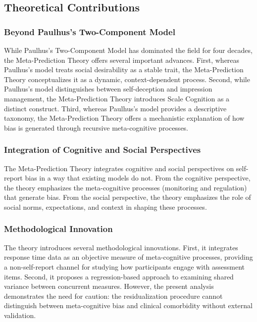 \documentclass[10pt,twocolumn]{article}
\begin{document}
\subsection{Theoretical Contributions}

\subsubsection{Beyond Paulhus's Two-Component Model}

While Paulhus's \citep{Paulhus1984} Two-Component Model has dominated the field for four decades, the Meta-Prediction Theory offers several important advances. First, whereas Paulhus's model treats social desirability as a stable trait, the Meta-Prediction Theory conceptualizes it as a dynamic, context-dependent process. Second, while Paulhus's model distinguishes between self-deception and impression management, the Meta-Prediction Theory introduces Scale Cognition as a distinct construct. Third, whereas Paulhus's model provides a descriptive taxonomy, the Meta-Prediction Theory offers a mechanistic explanation of how bias is generated through recursive meta-cognitive processes.

\subsubsection{Integration of Cognitive and Social Perspectives}

The Meta-Prediction Theory integrates cognitive and social perspectives on self-report bias in a way that existing models do not. From the cognitive perspective, the theory emphasizes the meta-cognitive processes (monitoring and regulation) that generate bias. From the social perspective, the theory emphasizes the role of social norms, expectations, and context in shaping these processes.

\subsubsection{Methodological Innovation}

The theory introduces several methodological innovations. First, it integrates response time data as an objective measure of meta-cognitive processes, providing a non-self-report channel for studying how participants engage with assessment items. Second, it proposes a regression-based approach to examining shared variance between concurrent measures. However, the present analysis demonstrates the need for caution: the residualization procedure cannot distinguish between meta-cognitive bias and clinical comorbidity without external validation.
\end{document}
